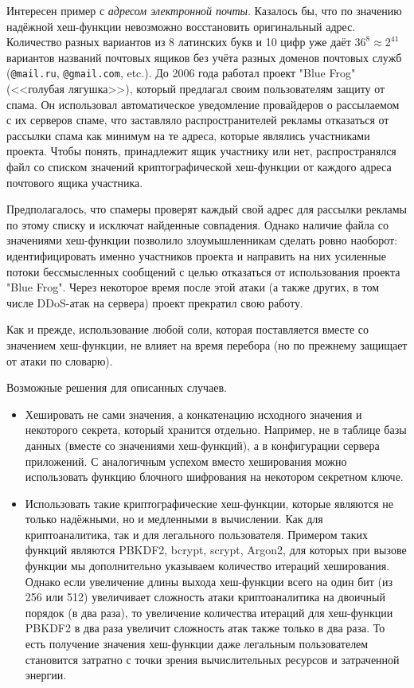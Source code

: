 Интересен пример с \emph{адресом электронной почты}. Казалось бы, что по значению надёжной хеш-функции невозможно восстановить оригинальный адрес. Количество разных вариантов из 8 латинских букв и 10 цифр уже даёт $36^8 \approx 2^{41}$ вариантов названий почтовых ящиков без учёта разных доменов почтовых служб (\texttt{@mail.ru}, \texttt{@gmail.com}, etc.). До 2006 года работал проект "Blue Frog" (<<голубая лягушка>>), который предлагал своим пользователям защиту от спама. Он использовал автоматическое уведомление провайдеров о рассылаемом с их серверов спаме, что заставляло распространителей рекламы отказаться от рассылки спама как минимум на те адреса, которые являлись участниками проекта. Чтобы понять, принадлежит ящик участнику или нет, распространялся файл со списком значений криптографической хеш-функции от каждого адреса почтового ящика участника.

Предполагалось, что спамеры проверят каждый свой адрес для рассылки рекламы по этому списку и исключат найденные совпадения. Однако наличие файла со значениями хеш-функции позволило злоумышленникам сделать ровно наоборот: идентифицировать именно участников проекта и направить на них усиленные потоки бессмысленных сообщений с целью отказаться от использования проекта "Blue Frog". Через некоторое время после этой атаки (а также других, в том числе DDoS-атак на сервера) проект прекратил свою работу.

Как и прежде, использование любой соли, которая поставляется вместе со значением хеш-функции, не влияет на время перебора (но по прежнему защищает от атаки по словарю).

Возможные решения для описанных случаев.

\begin{itemize}
    \item Хешировать не сами значения, а конкатенацию исходного значения и некоторого секрета, который хранится отдельно. Например, не в таблице базы данных (вместе со значениями хеш-функций), а в конфигурации сервера приложений. С аналогичным успехом вместо хеширования можно использовать функцию блочного шифрования на некотором секретном ключе.
    \item Использовать такие криптографические хеш-функции, которые являются не только надёжными, но и медленными в вычислении. Как для криптоаналитика, так и для легального пользователя. Примером таких функций являются \foreignlanguage{english}{PBKDF2, bcrypt, scrypt, Argon2}, для которых при вызове функции мы дополнительно указываем количество итераций хеширования. Однако если увеличение длины выхода хеш-функции всего на один бит (из 256 или 512) увеличивает сложность атаки криптоаналитика на двоичный порядок (в два раза), то увеличение количества итераций для хеш-функции PBKDF2 в два раза увеличит сложность атак также только в два раза. То есть получение значения хеш-функции даже легальным пользователем становится затратно с точки зрения вычислительных ресурсов и затраченной энергии.
\end{itemize}

